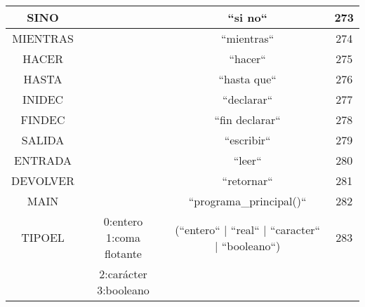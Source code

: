 \begin{table}[H]
\begin{tabular}{| c | c | c | c |}
SINO & & ``si no`` & 273\\ \hline
MIENTRAS & & ``mientras`` & 274\\ \hline
HACER& & ``hacer`` & 275\\ \hline
HASTA& & ``hasta que`` & 276\\ \hline
INIDEC& & ``declarar`` & 277\\ \hline
FINDEC& & ``fin declarar`` & 278\\ \hline
SALIDA & & ``escribir`` & 279\\ \hline
ENTRADA & & ``leer`` & 280\\ \hline
DEVOLVER & & ``retornar`` & 281\\ \hline
MAIN & & ``programa\_principal()`` & 282\\ \hline
TIPOEL & 0:entero 1:coma flotante  & (``entero`` | ``real`` | ``caracter`` | ``booleano``) & 283\\
& 2:carácter 3:booleano& & \\ \hline

\end{tabular}
\end{table}

